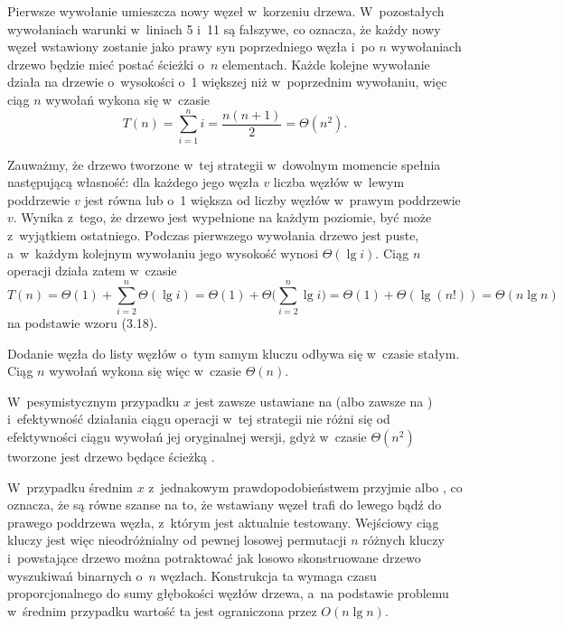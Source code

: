 \exercise %

\problems


\subproblem %
Pierwsze wywołanie  umieszcza nowy węzeł w~korzeniu drzewa.
W~pozostałych wywołaniach warunki w~liniach 5 i~11 są fałszywe, co oznacza, że każdy nowy węzeł wstawiony zostanie jako prawy syn poprzedniego węzła i~po $n$ wywołaniach  drzewo będzie mieć postać ścieżki o~$n$ elementach.
Każde kolejne wywołanie działa na drzewie o~wysokości o~1 większej niż w~poprzednim wywołaniu, więc ciąg $n$ wywołań wykona się w~czasie
\[
	T(n) = \sum_{i=1}^ni = \frac{n(n+1)}{2} = \Theta(n^2).
\]

\subproblem %
Zauważmy, że drzewo tworzone w~tej strategii w~dowolnym momencie spełnia następującą własność: dla każdego jego węzła $v$ liczba węzłów w~lewym poddrzewie $v$ jest równa lub o~1 większa od liczby węzłów w~prawym poddrzewie $v$.
Wynika z~tego, że drzewo jest wypełnione na każdym poziomie, być może z~wyjątkiem ostatniego.
Podczas pierwszego wywołania  drzewo jest puste, a~w~każdym kolejnym wywołaniu jego wysokość wynosi $\Theta(\lg i)$.
Ciąg $n$ operacji  działa zatem w~czasie
\[
	T(n) = \Theta(1)+\sum_{i=2}^n\Theta(\lg i) = \Theta(1)+\Theta\biggl(\sum_{i=2}^n\lg i\biggr) = \Theta(1)+\Theta(\lg(n!)) = \Theta(n\lg n)
\]
na podstawie wzoru (3.18).

\subproblem %
Dodanie węzła do listy węzłów o~tym samym kluczu odbywa się w~czasie stałym.
Ciąg $n$ wywołań  wykona się więc w~czasie $\Theta(n)$.

\subproblem %
W~pesymistycznym przypadku $x$ jest zawsze ustawiane na  (albo zawsze na ) i~efektywność działania ciągu operacji  w~tej strategii nie różni się od efektywności ciągu wywołań jej oryginalnej wersji, gdyż w~czasie $\Theta(n^2)$ tworzone jest drzewo będące ścieżką .

W~przypadku średnim $x$ z~jednakowym prawdopodobieństwem przyjmie  albo , co oznacza, że są równe szanse na to, że wstawiany węzeł trafi do lewego bądź do prawego poddrzewa węzła, z~którym jest aktualnie testowany.
Wejściowy ciąg kluczy jest więc nieodróżnialny od pewnej losowej permutacji $n$ różnych kluczy i~powstające drzewo można potraktować jak losowo skonstruowane drzewo wyszukiwań binarnych o~$n$ węzłach.
Konstrukcja ta wymaga czasu proporcjonalnego do sumy głębokości węzłów drzewa, a~na podstawie problemu  w~średnim przypadku wartość ta jest ograniczona przez $O(n\lg n)$.

